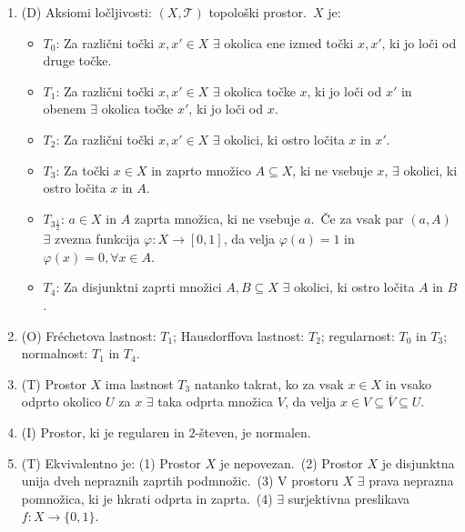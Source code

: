 \documentclass[10pt,a4paper]{article}
\newcommand{\TT}{\mathcal{T}}
\begin{document}
\begin{enumerate}
\item (D) Aksiomi ločljivosti:  $(X,\TT)$ topološki prostor.~$X$ je: \begin{itemize}
                
\item $T_0$: Za različni točki $x,x'\in X$ $\exists$ okolica ene izmed točki $x,x'$, ki jo loči od druge točke.
                
\item $T_1$: Za različni točki $x,x'\in X$ $\exists$ okolica točke $x$, ki jo loči od $x'$ in obenem $\exists$ okolica točke $x'$, ki jo loči od $x$.
                
\item $T_2$: Za različni točki $x,x'\in X$ $\exists$ okolici, ki ostro ločita $x$ in $x'$.
                
\item $T_3$: Za točki $x\in X$ in zaprto množico $A\subseteq X$, ki ne vsebuje $x$, $\exists$ okolici, ki ostro ločita $x$ in $A$.
                
\item $T_{3\frac{1}{2}}$: $a\in X$ in $A$ zaprta množica, ki ne vsebuje $a$.~Če za vsak par $(a,A)$ $\exists$ zvezna funkcija $\varphi:X\to[0,1]$, da velja $\varphi(a)=1$ in $\varphi(x)=0,\forall x\in A$.
                
\item $T_4$: Za disjunktni zaprti množici $A,B\subseteq X$ $\exists$ okolici, ki ostro ločita $A$ in $B$.
            \end{itemize}
            
\item (O) Fréchetova lastnost: $T_1$; Hausdorffova lastnost: $T_2$; regularnost: $T_0$ in $T_3$; normalnost: $T_1$ in $T_4$.
            
\item (T) Prostor $X$ ima lastnost $T_3$ natanko takrat, ko za vsak $x\in X$ in vsako odprto okolico $U$ za $x$ $\exists$ taka odprta množica $V$, da velja $x\in V\subseteq \overline{V}\subseteq U$.
            
\item (I) Prostor, ki je regularen in $2$-števen, je normalen.
            
\item (T) Ekvivalentno je: (1) Prostor $X$ je nepovezan.~(2) Prostor $X$ je disjunktna unija dveh nepraznih zaprtih podmnožic.~(3) V prostoru $X$ $\exists$ prava neprazna pomnožica, ki je hkrati odprta in zaprta.~(4) $\exists$ surjektivna preslikava $f:X\to\{0,1\}$.
            

\end{enumerate}
\end{document}
